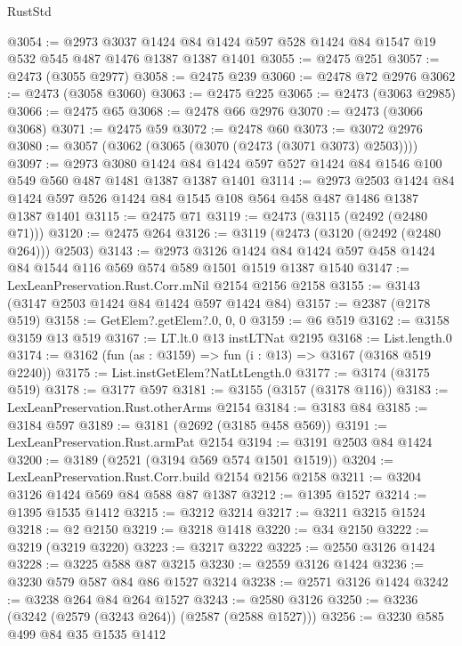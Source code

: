 \begin{lexlean}{RustStd}
\begin{coremodule}
{\begin{coremodule}
{{{{{{{{{{@3054 := @2973
    @3037
    @1424
    @84
    @1424
    @597
    @528
    @1424
    @84
    @1547
    @19
    @532
    @545
    @487
    @1476
    @1387
    @1387
    @1401
@3055 := @2475 @251
@3057 := @2473 (@3055 @2977)
@3058 := @2475 @239
@3060 := @2478 @72 @2976
@3062 := @2473 (@3058 @3060)
@3063 := @2475 @225
@3065 := @2473 (@3063 @2985)
@3066 := @2475 @65
@3068 := @2478 @66 @2976
@3070 := @2473 (@3066 @3068)
@3071 := @2475 @59
@3072 := @2478 @60
@3073 := @3072 @2976
@3080 := @3057 (@3062 (@3065 (@3070 (@2473 (@3071 @3073) @2503))))
@3097 := @2973
    @3080
    @1424
    @84
    @1424
    @597
    @527
    @1424
    @84
    @1546
    @100
    @549
    @560
    @487
    @1481
    @1387
    @1387
    @1401
@3114 := @2973
    @2503
    @1424
    @84
    @1424
    @597
    @526
    @1424
    @84
    @1545
    @108
    @564
    @458
    @487
    @1486
    @1387
    @1387
    @1401
@3115 := @2475 @71
@3119 := @2473 (@3115 (@2492 (@2480 @71)))
@3120 := @2475 @264
@3126 := @3119 (@2473 (@3120 (@2492 (@2480 @264))) @2503)
@3143 := @2973
    @3126
    @1424
    @84
    @1424
    @597
    @458
    @1424
    @84
    @1544
    @116
    @569
    @574
    @589
    @1501
    @1519
    @1387
    @1540
@3147 := LexLeanPreservation.Rust.Corr.mNil @2154 @2156 @2158
@3155 := @3143 (@3147 @2503 @1424 @84 @1424 @597 @1424 @84)
@3157 := @2387 (@2178 @519)
@3158 := GetElem?.getElem?.{0, 0, 0}
@3159 := @6 @519
@3162 := @3158 @3159 @13 @519
@3167 := LT.lt.{0} @13 instLTNat @2195
@3168 := List.length.{0}
@3174 := @3162 (fun (as : @3159) => fun (i : @13) => @3167 (@3168 @519 @2240))
@3175 := List.instGetElem?NatLtLength.{0}
@3177 := @3174 (@3175 @519)
@3178 := @3177 @597
@3181 := @3155 (@3157 (@3178 @116))
@3183 := LexLeanPreservation.Rust.otherArms @2154
@3184 := @3183 @84
@3185 := @3184 @597
@3189 := @3181 (@2692 (@3185 @458 @569))
@3191 := LexLeanPreservation.Rust.armPat @2154
@3194 := @3191 @2503 @84 @1424
@3200 := @3189 (@2521 (@3194 @569 @574 @1501 @1519))
@3204 := LexLeanPreservation.Rust.Corr.build @2154 @2156 @2158
@3211 := @3204 @3126 @1424 @569 @84 @588 @87 @1387
@3212 := @1395 @1527
@3214 := @1395 @1535 @1412
@3215 := @3212 @3214
@3217 := @3211 @3215 @1524
@3218 := @2 @2150
@3219 := @3218 @1418
@3220 := @34 @2150
@3222 := @3219 (@3219 @3220)
@3223 := @3217 @3222
@3225 := @2550 @3126 @1424
@3228 := @3225 @588 @87 @3215
@3230 := @2559 @3126 @1424
@3236 := @3230 @579 @587 @84 @86 @1527 @3214
@3238 := @2571 @3126 @1424
@3242 := @3238 @264 @84 @264 @1527
@3243 := @2580 @3126
@3250 := @3236 (@3242 (@2579 (@3243 @264)) (@2587 (@2588 @1527)))
@3256 := @3230 @585 @499 @84 @35 @1535 @1412
}}}}}}}}}}
\end{coremodule}}
\end{coremodule}
\end{lexlean}
